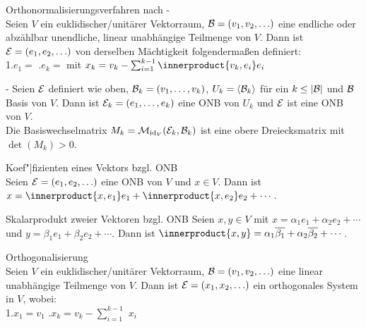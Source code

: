 \begin{Prozedur}{Orthonormalisierungsverfahren nach
                 -} \\
    Seien $V$ ein euklidischer/unitärer Vektorraum,
    $\mathcal{B} = (v_1, v_2, \ldots)$ eine endliche oder abzählbar unendliche,
    linear unabhängige Teilmenge von $V$.
    Dann ist $\mathcal{E} = (e_1, e_2, \ldots)$ von derselben Mächtigkeit
    folgendermaßen definiert: \\
    1.\quad $e_1 =$  \qquad{}.\quad $e_k =$  mit
    $x_k = v_k - \sum_{i=1}^{k-1} \innerproduct{v_k, e_i}e_i$
\end{Prozedur}

\begin{Satz}{-}
    Seien $\mathcal{E}$ definiert wie oben,
    $\mathcal{B}_k = (v_1, \ldots, v_k)$, $U_k = \langle \mathcal{B}_k \rangle$
    für ein $k \le |\mathcal{B}|$ und
    $\mathcal{B}$ Basis von $V$.
    Dann ist $\mathcal{E}_k = (e_1, \ldots, e_k)$ eine ONB von $U_k$ und
    $\mathcal{E}$ ist eine ONB von $V$. \\
    Die Basiswechselmatrix $M_k = \mathcal{M}_{\operatorname{id}_V}(\mathcal{E}_k, \mathcal{B}_k)$
    ist eine obere Dreiecksmatrix mit $\det(M_k) > 0$.
\end{Satz}

\begin{Satz}{Koef"|fizienten eines Vektors bzgl. ONB} \\
    Seien $\mathcal{E} = (e_1, e_2, \ldots)$ eine ONB von $V$ und $x \in V$.
    Dann ist $x = \innerproduct{x, e_1}e_1 + \innerproduct{x, e_2}e_2 + \cdots$.
\end{Satz}

\begin{Satz}{Skalarprodukt zweier Vektoren bzgl. ONB}
    Seien $x, y \in V$ mit $x = \alpha_1 e_1 + \alpha_2 e_2 + \cdots$
    und $y = \beta_1 e_1 + \beta_2 e_2 + \cdots$.
    Dann ist
    $\innerproduct{x, y} = \alpha_1 \kk{\beta_1} + \alpha_2 \kk{\beta_2} + \cdots$.
\end{Satz}

\pagebreak

\begin{Satz}{Orthogonalisierung} \\
    Seien $V$ ein euklidischer/unitärer Vektorraum,
    $\mathcal{B} = (v_1, v_2, \ldots)$ eine linear unabhängige Teilmenge von $V$.
    Dann ist $\mathcal{E} = (x_1, x_2, \ldots)$ ein orthogonales System in $V$,
    wobei: \\
    1.\quad $x_1 = v_1$ \qquad{}.\quad $x_k = v_k - \sum_{i=1}^{k-1}$
     $x_i$
\end{Satz}

